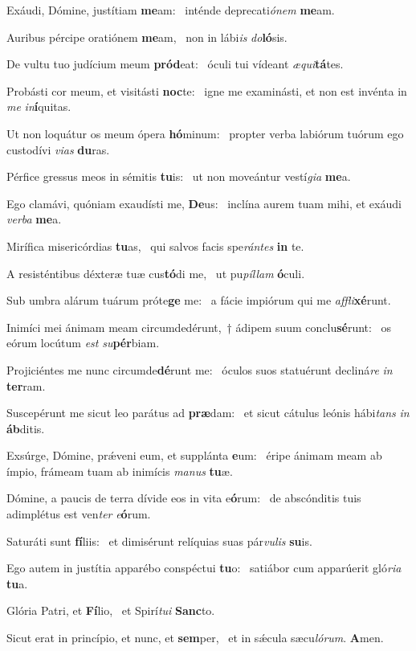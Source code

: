 \item Exáudi, Dómine, justítiam \textbf{me}am:~\psstar{} inténde deprecati\textit{ónem} \textbf{me}am.
\item Auribus pércipe oratiónem \textbf{me}am,~\psstar{} non in lábi\textit{is} \textit{do}\textbf{ló}sis.
\item De vultu tuo judícium meum \textbf{pród}eat:~\psstar{} óculi tui vídeant \textit{æqui}\textbf{tá}tes.
\item Probásti cor meum, et visitásti \textbf{noc}te:~\psstar{} igne me examinásti, et non est invénta in \textit{me} \textit{in}\textbf{í}quitas.
\item Ut non loquátur os meum ópera \textbf{hó}minum:~\psstar{} propter verba labiórum tuórum ego custodívi \textit{vias} \textbf{du}ras.
\item Pérfice gressus meos in sémitis \textbf{tu}is:~\psstar{} ut non moveántur vestí\textit{gia} \textbf{me}a.
\item Ego clamávi, quóniam exaudísti me, \textbf{De}us:~\psstar{} inclína aurem tuam mihi, et exáudi \textit{verba} \textbf{me}a.
\item Mirífica misericórdias \textbf{tu}as,~\psstar{} qui salvos facis spe\textit{rántes} \textbf{in} te.
\item A resisténtibus déxteræ tuæ cus\textbf{tó}di me,~\psstar{} ut pu\textit{píllam} \textbf{ó}culi.
\item Sub umbra alárum tuárum próte\textbf{ge} me:~\psstar{} a fácie impiórum qui me \textit{affli}\textbf{xé}runt.
\item Inimíci mei ánimam meam circumdedérunt,~† ádipem suum conclu\textbf{sé}runt:~\psstar{} os eórum locútum \textit{est} \textit{su}\textbf{pér}biam.
\item Projiciéntes me nunc circumde\textbf{dé}runt me:~\psstar{} óculos suos statuérunt decliná\textit{re} \textit{in} \textbf{ter}ram.
\item Suscepérunt me sicut leo parátus ad \textbf{præ}dam:~\psstar{} et sicut cátulus leónis hábi\textit{tans} \textit{in} \textbf{áb}ditis.
\item Exsúrge, Dómine, prǽveni eum, et supplánta \textbf{e}um:~\psstar{} éripe ánimam meam ab ímpio, frámeam tuam ab inimícis \textit{manus} \textbf{tu}æ.
\item Dómine, a paucis de terra dívide eos in vita e\textbf{ó}rum:~\psstar{} de abscónditis tuis adimplétus est ven\textit{ter} \textit{e}\textbf{ó}rum.
\item Saturáti sunt \textbf{fí}liis:~\psstar{} et dimisérunt relíquias suas pár\textit{vulis} \textbf{su}is.
\item Ego autem in justítia apparébo conspéctui \textbf{tu}o:~\psstar{} satiábor cum apparúerit gló\textit{ria} \textbf{tu}a.
\item Glória Patri, et \textbf{Fí}lio,~\psstar{} et Spirí\textit{tui} \textbf{Sanc}to.
\item Sicut erat in princípio, et nunc, et \textbf{sem}per,~\psstar{} et in sǽcula sæcu\textit{lórum}. \textbf{A}men.
